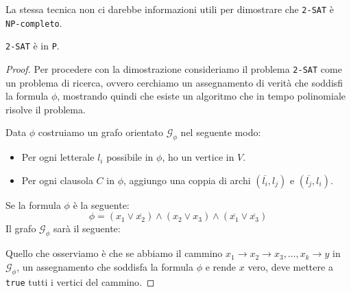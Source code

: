 La stessa tecnica non ci darebbe informazioni utili per dimostrare che \texttt{2-SAT}
è \texttt{NP-completo}. 

\begin{theorem}
    \texttt{2-SAT} è in \texttt{P}.
\end{theorem}
\begin{proof}
    Per procedere con la dimostrazione consideriamo il problema \texttt{2-SAT} come
    un problema di ricerca, ovvero cerchiamo un assegnamento di verità che soddisfi
    la formula $\phi$, mostrando quindi che esiste un algoritmo che in tempo polinomiale
    risolve il problema.

    Data $\phi$ costruiamo un grafo orientato $\mathcal{G}_\phi$ nel seguente modo:
    \begin{itemize}
        \item Per ogni letterale $l_i$ possibile in $\phi$, ho un vertice 
        in $V$.
        \item Per ogni clausola $C$ in $\phi$, aggiungo una coppia di archi 
        $(\overline{l_i}, l_j)$ e $(\overline{l_j}, l_i)$.
    \end{itemize}
    Se la formula $\phi$ è la seguente:
    \[
        \phi = (x_1 \lor \overline{x_2}) \land (x_2 \lor x_3) \land (\overline{x_1}
        \lor \overline{x_3})
    \]
    Il grafo $\mathcal{G}_\phi$ sarà il seguente:
    \begin{figure}[H]
        \centering 
    \end{figure}
    Quello che osserviamo è che se abbiamo il cammino $x_1 \rightarrow x_2 \rightarrow x_3,
    \dots, x_k \rightarrow y$ in $\mathcal{G}_\phi$,
    un assegnamento che soddisfa la formula $\phi$ e rende $x$ vero, deve mettere a \texttt{true}
    tutti i vertici del cammino.
\end{proof}